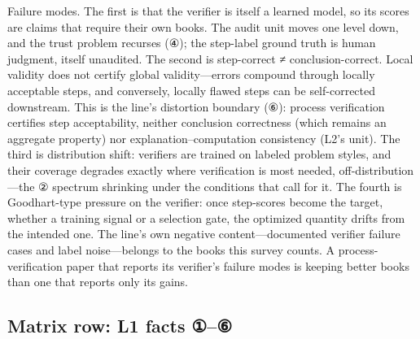 \documentclass[11pt,a4paper]{article}
\begin{document}
Failure modes. The first is that the verifier is itself a learned model, so its scores are claims that require their own books. The audit unit moves one level down, and the trust problem recurses (④); the step-label ground truth is human judgment, itself unaudited. The second is step-correct ≠ conclusion-correct. Local validity does not certify global validity—errors compound through locally acceptable steps, and conversely, locally flawed steps can be self-corrected downstream. This is the line's distortion boundary (⑥): process verification certifies step acceptability, neither conclusion correctness (which remains an aggregate property) nor explanation–computation consistency (L2's unit). The third is distribution shift: verifiers are trained on labeled problem styles, and their coverage degrades exactly where verification is most needed, off-distribution—the ② spectrum shrinking under the conditions that call for it. The fourth is Goodhart-type pressure on the verifier: once step-scores become the target, whether a training signal or a selection gate, the optimized quantity drifts from the intended one. The line's own negative content—documented verifier failure cases and label noise—belongs to the books this survey counts. A process-verification paper that reports its verifier's failure modes is keeping better books than one that reports only its gains.

\subsection{Matrix row: L1 facts ①–⑥}
\end{document}
